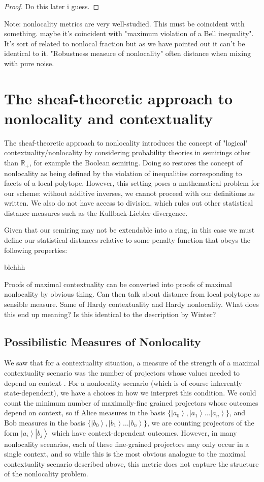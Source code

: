 \documentclass{amsart}
\theoremstyle{definition}
\newcommand{\ket}[1]{{\left\vert{#1}\right\rangle}}
\begin{document}
\begin{proof}
Do this later i guess.

\end{proof}

Note: nonlocality metrics are very well-studied. This must be coincident with something. maybe it's coincident with "maximum violation of a Bell inequality". It's sort of related to nonlocal fraction but as we have pointed out it can't be identical to it. "Robustness measure of nonlocality" often distance when mixing with pure noise.

\section{The sheaf-theoretic approach to nonlocality and contextuality}

The sheaf-theoretic approach to nonlocality introduces the concept of "logical" contextuality/nonlocality by considering probability theories in semirings other than $\mathbb{R}_+$, for example the Boolean semiring. Doing so restores the concept of nonlocality as being defined by the violation of inequalities corresponding to facets of a local polytope. However, this setting poses a mathematical problem for our scheme: without additive inverses, we cannot proceed with our definitions as written. We also do not have access to division, which rules out other statistical distance measures such as the Kullback-Liebler divergence.

Given that our semiring may not be extendable into a ring, in this case we must define our statistical distances relative to some penalty function that obeys the following properties:

blehhh

Proofs of maximal contextuality can be converted into proofs of maximal nonlocality by obvious thing. Can then talk about distance from local polytope as sensible measure. Same of Hardy contextuality and Hardy nonlocality.
What does this end up meaning? Is this identical to the description by Winter?

\subsection{Possibilistic Measures of Nonlocality}

We saw that for a contextuality situation, a measure of the strength of a maximal contextuality scenario was the number of projectors whose values needed to depend on context . For a nonlocality scenario (which is of course inherently state-dependent), we have a choices in how we interpret this condition. We could count the minimum number of maximally-fine grained projectors whose outcomes depend on context, so if Alice measures in the basis $\{\ket{a_0},\ket{a_1}\dots\ket{a_n}\}$, and Bob measures in the basis $\{\ket{b_0},\ket{b_1}\dots\ket{b_n}\}$, we are counting projectors of the form $\ket{a_i}\ket{b_j}$ which have context-dependent outcomes. However, in many nonlocality scenarios, each of these fine-grained projectors may only occur in a single context, and so while this is the most obvious analogue to the maximal contextuality scenario described above, this metric does not capture the structure of the nonlocality problem.
\end{document}
